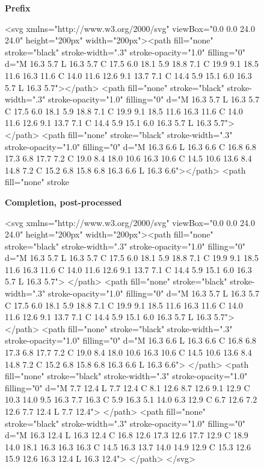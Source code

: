 \documentclass[11pt]{article}
\begin{document}
\begin{figure}[htbp]
	\centering

	\begin{minipage}[t]{.48\linewidth}

		\begin{center}
			\textbf{Prefix}
		\end{center}

		<svg xmlns="http://www.w3.org/2000/svg" viewBox="0.0 0.0 24.0 24.0" height="200px" width="200px"><path fill="none"
		stroke="black" stroke-width=".3" stroke-opacity="1.0" filling="0" d="M 16.3 5.7 L 16.3 5.7 C 17.5 6.0 18.1 5.9 18.8
		7.1 C 19.9 9.1 18.5 11.6 16.3 11.6 C 14.0 11.6 12.6 9.1 13.7 7.1 C 14.4 5.9 15.1 6.0 16.3 5.7 L 16.3 5.7"></path>
		<path fill="none" stroke="black" stroke-width=".3" stroke-opacity="1.0" filling="0" d="M 16.3 5.7 L 16.3 5.7 C 17.5
		6.0 18.1 5.9 18.8 7.1 C 19.9 9.1 18.5 11.6 16.3 11.6 C 14.0 11.6 12.6 9.1 13.7 7.1 C 14.4 5.9 15.1 6.0 16.3 5.7 L 16.3
		5.7"></path> <path fill="none" stroke="black" stroke-width=".3" stroke-opacity="1.0" filling="0" d="M 16.3 6.6 L 16.3 6.6
		C 16.8 6.8 17.3 6.8 17.7 7.2 C 19.0 8.4 18.0 10.6 16.3 10.6 C 14.5 10.6 13.6 8.4 14.8 7.2 C 15.2 6.8 15.8 6.8 16.3 6.6 L
		16.3 6.6"></path> <path fill="none" stroke
	\end{minipage}
	\hspace{1ex}
	\begin{minipage}[t]{.48\linewidth}
		\begin{center}
			\textbf{Completion, post-processed}
		\end{center}

		<svg xmlns="http://www.w3.org/2000/svg" viewBox="0.0 0.0 24.0 24.0" height="200px" width="200px"><path fill="none"
		stroke="black" stroke-width=".3" stroke-opacity="1.0" filling="0" d="M 16.3 5.7 L 16.3 5.7 C 17.5 6.0 18.1 5.9 18.8
		7.1 C 19.9 9.1 18.5 11.6 16.3 11.6 C 14.0 11.6 12.6 9.1 13.7 7.1 C 14.4 5.9 15.1 6.0 16.3 5.7 L 16.3 5.7"> </path>
		<path fill="none" stroke="black" stroke-width=".3" stroke-opacity="1.0" filling="0" d="M 16.3 5.7 L 16.3 5.7 C 17.5
		6.0 18.1 5.9 18.8 7.1 C 19.9 9.1 18.5 11.6 16.3 11.6 C 14.0 11.6 12.6 9.1 13.7 7.1 C 14.4 5.9 15.1 6.0 16.3 5.7 L 16.3
		5.7"> </path> <path fill="none" stroke="black" stroke-width=".3" stroke-opacity="1.0" filling="0" d="M 16.3 6.6 L 16.3 6.6
		C 16.8 6.8 17.3 6.8 17.7 7.2 C 19.0 8.4 18.0 10.6 16.3 10.6 C 14.5 10.6 13.6 8.4 14.8 7.2 C 15.2 6.8 15.8 6.8 16.3 6.6 L
		16.3 6.6"> </path> <path fill="none" stroke="black" stroke-width=".3" stroke-opacity="1.0" filling="0" d="M 7.7 12.4 L 7.7
		12.4 C 8.1 12.6 8.7 12.6 9.1 12.9 C 10.3 14.0 9.5 16.3 7.7 16.3 C 5.9 16.3 5.1 14.0 6.3 12.9 C 6.7 12.6 7.2 12.6 7.7 12.4 L
		7.7 12.4"> </path> <path fill="none" stroke="black" stroke-width=".3" stroke-opacity="1.0" filling="0" d="M 16.3 12.4 L 16.3
		12.4 C 16.8 12.6 17.3 12.6 17.7 12.9 C 18.9 14.0 18.1 16.3 16.3 16.3 C 14.5 16.3 13.7 14.0 14.9 12.9 C 15.3 12.6 15.9 12.6
		16.3 12.4 L 16.3 12.4"> </path> </svg>


\end{minipage}
\end{figure}
\end{document}

